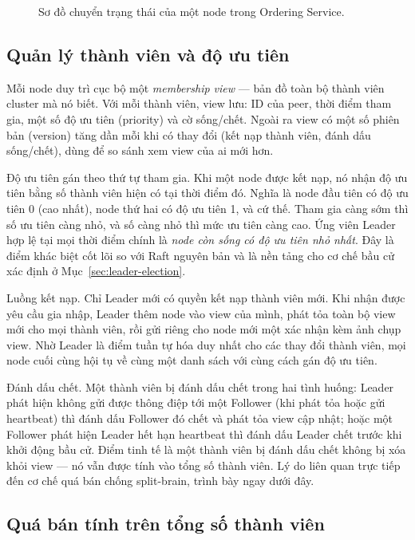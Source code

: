 \begin{figure}[H]
\centering
\caption{Sơ đồ chuyển trạng thái của một node trong Ordering Service.}
\label{fig:raft-states}
\end{figure}

\subsection{Quản lý thành viên và độ ưu tiên}
\label{sec:ordering-membership}

Mỗi node duy trì cục bộ một \textit{membership view} --- bản đồ toàn bộ thành viên
cluster mà nó biết. Với mỗi thành viên, view lưu: ID của peer, thời điểm tham gia,
một số độ ưu tiên (priority) và cờ sống/chết. Ngoài ra view có một số
phiên bản (version) tăng dần mỗi khi có thay đổi (kết nạp thành viên, đánh
dấu sống/chết), dùng để so sánh xem view của ai mới hơn.

Độ ưu tiên gán theo thứ tự tham gia. Khi một node được kết nạp, nó nhận
độ ưu tiên bằng số thành viên hiện có tại thời điểm đó. Nghĩa là node đầu tiên có
độ ưu tiên 0 (cao nhất), node thứ hai có độ ưu tiên 1, và cứ thế. Tham gia
càng sớm thì số ưu tiên càng nhỏ, và số càng nhỏ thì mức ưu tiên càng cao. Ứng
viên Leader hợp lệ tại mọi thời điểm chính là \textit{node còn sống có độ ưu tiên
nhỏ nhất}. Đây là điểm khác biệt cốt lõi so với Raft nguyên bản và là nền tảng cho
cơ chế bầu cử xác định ở Mục~\ref{sec:leader-election}.

Luồng kết nạp. Chỉ Leader mới có quyền kết nạp thành viên mới. Khi nhận
được yêu cầu gia nhập, Leader thêm node vào view của mình, phát tỏa toàn bộ view
mới cho mọi thành viên, rồi gửi riêng cho node mới một xác nhận kèm ảnh chụp view.
Nhờ Leader là điểm tuần tự hóa duy nhất cho các thay đổi thành viên, mọi node cuối
cùng hội tụ về cùng một danh sách với cùng cách gán độ ưu tiên.

Đánh dấu chết. Một thành viên bị đánh dấu chết trong hai tình huống:
Leader phát hiện không gửi được thông điệp tới một Follower (khi phát tỏa hoặc gửi
heartbeat) thì đánh dấu Follower đó chết và phát tỏa view cập nhật; hoặc một
Follower phát hiện Leader hết hạn heartbeat thì đánh dấu Leader chết trước khi khởi
động bầu cử. Điểm tinh tế là một thành viên bị đánh dấu chết không bị xóa
khỏi view --- nó vẫn được tính vào tổng số thành viên. Lý do liên quan trực tiếp
đến cơ chế quá bán chống split-brain, trình bày ngay dưới đây.

\subsection{Quá bán tính trên tổng số thành viên}
\label{sec:quorum}

